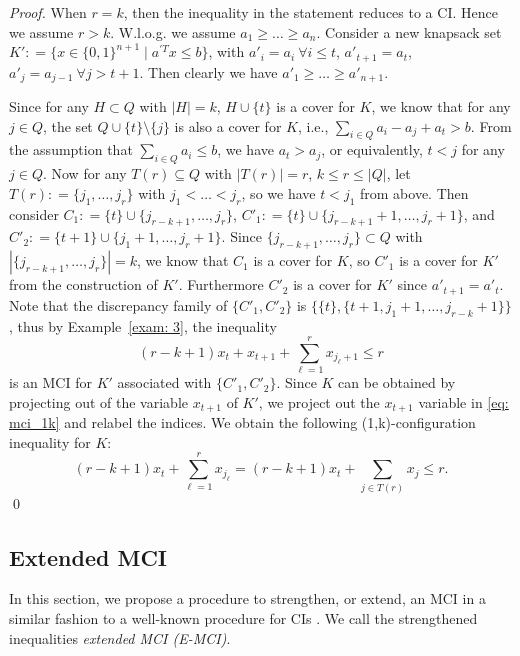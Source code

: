 \begin{proof}
When $r = k$, then the inequality in the statement reduces to a CI. 
Hence we assume $r > k$. 
W.l.o.g. we assume $a_1  \geq \ldots \geq a_n$. Consider a new knapsack set $K': = \{x \in \{0,1\}^{n+1} \mid a^{\prime T} x \leq b\}$, with $a'_i = a_i \ \forall i \leq t$, $a'_{t+1} = a_t$, $a'_j = a_{j-1} \ \forall j > t+1.$ 
Then clearly we have $a'_1 \geq \ldots \geq a'_{n+1}$. 

Since for any $H \subset Q$ with $|H| = k$, $H \cup \{t\}$ is a cover for $K$, we know that for any $j \in Q$, the set $Q  \cup \{t\} \setminus \{j\}$ is also a cover for $K$, i.e., $\sum_{i \in Q} a_i - a_j + a_t > b$. 
From the assumption that $\sum_{i \in Q}a_i \leq b$, we have $a_t > a_j$, or equivalently, $t < j$ for any $j \in Q$. 
Now for any $T(r) \subseteq Q$ with $|T(r)| = r$, $k \leq r \leq |Q|$, let $T(r): = \{j_1, \ldots, j_r\}$ with $j_1 < \ldots < j_r$, so we have $t < j_1$ from above. 
Then consider $C_1: = \{t\} \cup \{j_{r-k+1}, \ldots, j_r\}$, $C'_1: = \{t\} \cup \{j_{r-k+1} + 1, \ldots, j_r + 1\}$, and $C'_2 : = \{t+1\} \cup \{j_{1} + 1, \ldots, j_r + 1\}$. 
Since $\{j_{r-k+1}, \ldots, j_r\} \subset Q$ with $|\{j_{r-k+1}, \ldots, j_r\}| = k$, we know that $C_1$ is a cover for $K$, 
so $C'_1$ is a cover for $K'$ from the construction of $K'$. 
Furthermore $C'_2$ is a cover for $K'$ since $a'_{t+1} = a'_t$. Note that the discrepancy family of $\{C'_1, C'_2\}$ is $\{\{t\}, \{t+1, j_1 + 1, \ldots, j_{r-k} + 1\}\}$, thus by Example~\ref{exam: 3}, the inequality
\begin{equation}
\label{eq: mci_1k}
(r-k+1) x_t + x_{t+1} + \sum_{\ell=1}^r x_{j_\ell + 1} \leq r
\end{equation}
is an MCI for $K'$ associated with $\{C'_1, C'_2\}$.
Since $K$ can be obtained by projecting out of the variable $x_{t+1}$ of $K'$, we project out the $x_{t+1}$ variable in \eqref{eq: mci_1k} and relabel the indices.
We obtain the following (1,k)-configuration inequality for $K$:
$$
(r-k+1) x_t + \sum_{\ell=1}^r x_{j_\ell} = (r-k+1) x_t + \sum_{j \in T(r)}x_j \leq r.
$$
\qed \end{proof}


\subsection{Extended MCI}
\label{subsec: extended_MCI}
In this section, we propose a procedure to strengthen, or extend, an MCI in a similar fashion to a well-known procedure for CIs \cite{balas1975facets}.  We call the strengthened inequalities \emph{extended MCI (E-MCI)}.


